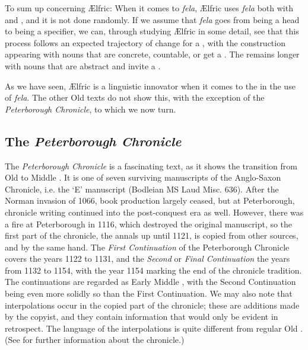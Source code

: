 \documentclass[output=paper,colorlinks,citecolor=brown]{langscibook}
\begin{document}
To sum up concerning Ælfric: When it comes to \textit{fela}, Ælfric uses \textit{fela} both with  and , and it is not done randomly. If we assume that \textit{fela} goes from being a head to being a specifier, we can, through studying Ælfric in some detail, see that this process follows an expected trajectory of change for a , with the  construction appearing with nouns that are concrete, countable, or get a . The  remains longer with nouns that are abstract and invite a .

As we have seen, Ælfric is a linguistic innovator when it comes to the  in the use of \textit{fela}. The other Old  texts do not show this, with the exception of the \textit{Peterborough Chronicle}, to which we now turn.


\subsection{The \textit{Peterborough Chronicle}}\label{ssect:peterb}

The \textit{Peterborough Chronicle} is a fascinating text, as it shows the transition from Old to Middle . It is one of seven surviving manuscripts of the Anglo-Saxon Chronicle, i.e. the ‘E’ manuscript (Bodleian MS Laud Misc. 636). After the Norman invasion of 1066,  book production largely ceased, but at Peterborough, chronicle writing continued into the post-conquest era as well. However, there was a fire at Peterborough in 1116, which destroyed the original manuscript, so the first part of the chronicle, the annals up until 1121, is copied from other sources, and by the same hand. The \textit{First Continuation} of the Peterborough Chronicle covers the years 1122 to 1131, and the \textit{Second} or \textit{Final Continuation} the years from 1132 to 1154, with the year 1154 marking the end of the  chronicle tradition. The continuations are regarded as Early Middle , with the Second Continuation being even more solidly so than the First Continuation. We may also note that interpolations occur in the copied part of the chronicle; these are additions made by the copyist, and they contain information that would only be evident in retrospect. The language of the interpolations is quite different from regular Old . (See \cite[5--12]{BergsSkaffari07} for further information about the chronicle.)
\end{document}
